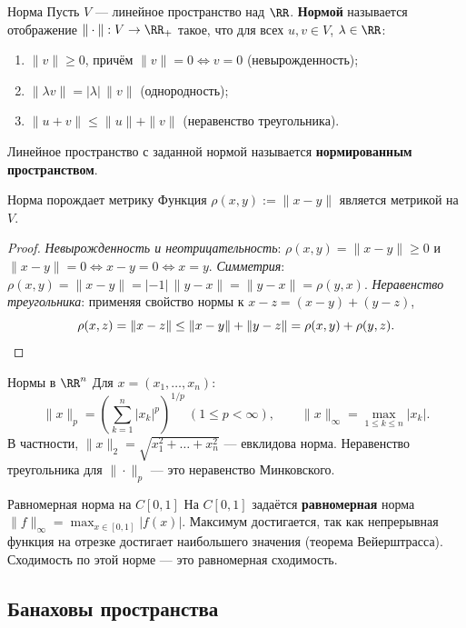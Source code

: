 \begin{Definition}[required]{Норма}{}
	Пусть $V$ --- линейное пространство над $\RR$. \textbf{Нормой} называется
	отображение $\|\cdot\|:V\to\RR_+$ такое, что для всех $u,v\in V$,
	$\lambda\in\RR$:
	\begin{enumerate}
		\item $\|v\|\ge0$, причём $\|v\|=0\iff v=0$ (невырожденность);
		\item $\|\lambda v\|=|\lambda|\,\|v\|$ (однородность);
		\item $\|u+v\|\le\|u\|+\|v\|$ (неравенство треугольника).
	\end{enumerate}
	Линейное пространство с заданной нормой называется
	\textbf{нормированным пространством}.
\end{Definition}

\begin{Statement}{Норма порождает метрику}{}
	Функция $\rho(x,y):=\|x-y\|$ является метрикой на $V$.
\end{Statement}

\begin{proof}
	\emph{Невырожденность и неотрицательность}: $\rho(x,y)=\|x-y\|\ge0$ и
	$\|x-y\|=0\iff x-y=0\iff x=y$. \emph{Симметрия}:
	$\rho(x,y)=\|x-y\|=|-1|\,\|y-x\|=\|y-x\|=\rho(y,x)$.
	\emph{Неравенство треугольника}: применяя свойство нормы к
	$x-z=(x-y)+(y-z)$,
	\[
	\rho(x,z)=\|x-z\|\le\|x-y\|+\|y-z\|=\rho(x,y)+\rho(y,z). \qedhere
	\]
\end{proof}

\begin{Example}{Нормы в $\RR^n$}{}
	Для $x=(x_1,\dots,x_n)$:
	\[
	\|x\|_p=\left(\sum_{k=1}^{n}|x_k|^p\right)^{1/p}\ (1\le p<\infty),
	\qquad
	\|x\|_\infty=\max_{1\le k\le n}|x_k|.
	\]
	В частности, $\|x\|_2=\sqrt{x_1^2+\dots+x_n^2}$ --- евклидова норма.
	Неравенство треугольника для $\|\cdot\|_p$ --- это неравенство Минковского.
\end{Example}

\begin{Example}{Равномерная норма на $C[0,1]$}{}
	На $C[0,1]$ задаётся \textbf{равномерная} норма
	$\|f\|_\infty=\max_{x\in[0,1]}|f(x)|$. Максимум достигается, так как
	непрерывная функция на отрезке достигает наибольшего значения (теорема
	Вейерштрасса). Сходимость по этой норме --- это равномерная сходимость.
\end{Example}

\subsection*{Банаховы пространства}

